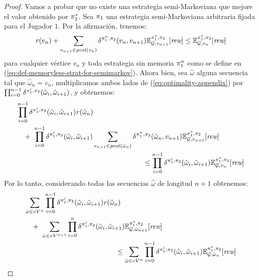 \begin{proof}
  Vamos a probar que no existe una estrategia semi-Markoviana que mejore el valor obtenido por $\pi^*_{1}$.  Sea $\pi_{1}$ una estrategia semi-Markoviana arbitraria fijada para el Jugador $1$.  Por la afirmación, tenemos:
  \begin{equation}\label{eq:optimality-appendix}
    \mathit{r}(v_n) + \sum_{v_{n+1} \in \mathit{post}(v_n)} \delta^{\pi_{1}^n,\pi_{2}}(v_n, v_{n+1}) \mathbb{E}^{\pi^*_{1}, \pi_{2}}_{\mathcal{G},v_{n+1}}[\textit{rew}] \leq \mathbb{E}^{\pi^*_{1}, \pi_{2}}_{\mathcal{G},v_n}[\textit{rew}]
  \end{equation}
  para cualquier vértice $v_n$ y toda estrategia sin memoria $\pi_{1}^n$ como se define en (\ref{eq:def-memoryless-strat-for-semimarkov}).  Ahora bien, sea $\hat{\omega}$ alguna secuencia tal que
  $\hat{\omega}_n = v_n$, multiplicamos ambos lados de (\ref{eq:optimality-appendix}) por $\prod^{n-1}_{i=0} \delta^{\pi_{1}^i,\pi_{2}}(\hat{\omega}_i,\hat{\omega}_{i+1})$,
  y obtenemos:
  \begin{align*}
    & \prod^{n-1}_{i=0}\delta^{\strat{1}^i, \strat{2}}(\hat{\omega}_i, \hat{\omega}_{i+1}) \reward(\hat{\omega}_n) \\
    & \quad + \ \prod^{n-1}_{i=0}\delta^{\strat{1}^i,\strat{2}}(\hat{\omega}_i, \hat{\omega}_{i+1}) \sum_{v_{n+1} \in \post(\hat{\omega}_n)}  \delta^{\strat{1}^n,\strat{2}}(\hat{\omega}_n, v_{n+1}) \Expect{\starredstrat{1}}{\strat{2}}_{\StochG,v_{n+1}}[\Rewards] \\
    & \hspace{18em} \leq 
    \prod^{n-1}_{i=0}\delta^{\strat{1}^i,\strat{2}}(\hat{\omega}_i,\hat{\omega}_{i+1}) \Expect{\starredstrat{1}}{\strat{2}}_{\StochG,v_n}[\Rewards]
  \end{align*}
  Por lo tanto,  considerando todas las secuencias $\hat{\omega}$ de longitud $n+1$ obtenemos:
  \begin{align*}
    & \sum_{\hat{\omega} \in vV^{n}} \prod^{n-1}_{i=0}\delta^{\strat{1}^i,\strat{2}}(\hat{\omega}_i,  \hat{\omega}_{i+1}) \reward(\hat{\omega}_n) \\
    & \quad + \ \sum_{\hat{\omega} \in vV^{n+1}} \prod^{n}_{i=0}\delta^{\strat{1}^i,\strat{2}}(\hat{\omega}_i,\hat{\omega}_{i+1})  \Expect{\starredstrat{1}}{\strat{2}}_{\StochG,\hat{\omega}_{n+1}}[\Rewards]\\
    & \hspace{13em} \leq 
	\sum_{\hat{\omega} \in vV^{n}} \prod^{n-1}_{i=0}\delta^{\strat{1}^i,\strat{2}}(\hat{\omega}_i, \hat{\omega}_{i+1}) \Expect{\starredstrat{1}}{\strat{2}}_{\StochG,\hat{\omega}_n}[\Rewards]

\end{align*}
\end{proof}
